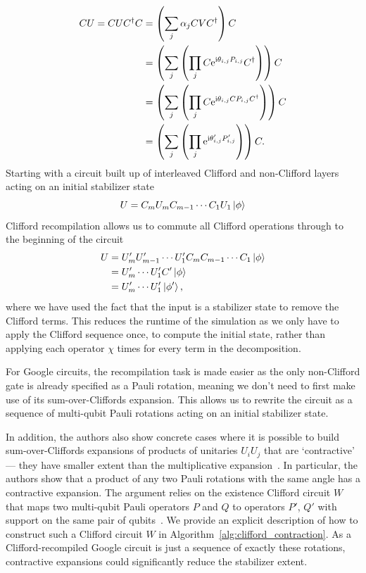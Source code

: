\begin{align}
C U = CUC^{\dagger} C &= \left(\sum_{j}\alpha_{j}CVC^{\dagger}\right)C \nonumber \\
&= \left(\sum_{j}\left(\prod_{j} C\mathrm{e}^{\mathrm{i}\theta_{i,j}P_{i,j}}C^{\dagger} \right)\right)C\nonumber\\
&= \left(\sum_{j}\left(\prod_{j} C\mathrm{e}^{\mathrm{i}\theta_{i,j}CP_{i,j}C^{\dagger}} \right)\right)C \nonumber \\
&= \left(\sum_{j}\left(\prod_{j} \mathrm{e}^{\mathrm{i}\theta'_{i,j}P'_{i,j}} \right)\right)C.
\end{align}
Starting with a circuit built up of interleaved Clifford and non-Clifford layers acting on an initial stabilizer state
\[U = C_{m}U_{m}C_{m-1}\cdots C_{1}U_{1}\ket{\phi}\]
Clifford recompilation allows us to commute all Clifford operations through to the beginning of the circuit
\begin{align*}
U &= U_{m}'U_{m-1}'\cdots U_{1}' C_{m}C_{m-1}\cdots C_{1}\ket{\phi} \\
  &= U_{m}'\cdots U_{1}' C'\ket{\phi}\\
  &= U_{m}'\cdots U_{1}'\ket{\phi'},
\end{align*}
where we have used the fact that the input is a stabilizer state to remove the Clifford terms.
This reduces the runtime of the simulation as we only have to apply the Clifford sequence once, to compute the initial state, rather than applying each operator $\chi$ times for every term in the decomposition.\par
For Google circuits, the recompilation task is made easier as the only non-Clifford gate is already specified as a Pauli rotation, meaning we don't need to first make use of its sum-over-Cliffords expansion. This allows us to rewrite the circuit as a sequence of multi-qubit Pauli rotations acting on an initial stabilizer state.\par
In addition, the authors also show concrete cases where it is possible to build sum-over-Cliffords expansions of products of unitaries $U_{i}U_{j}$ that are `contractive' --- they have smaller extent than the multiplicative expansion~\cite{Qassim2019}. In particular, the authors show that a product of any two Pauli rotations with the same angle has a contractive expansion. The argument relies on the existence Clifford circuit $W$ that maps two multi-qubit Pauli operators $P$ and $Q$ to operators $P'$, $Q'$ with support on the same pair of qubits~\cite{Qassim2019}. We provide an explicit description of how to construct such a Clifford circuit $W$ in Algorithm~\ref{alg:clifford_contraction}. As a Clifford-recompiled Google circuit is just a sequence of exactly these rotations, contractive expansions could significantly reduce the stabilizer extent.\par
